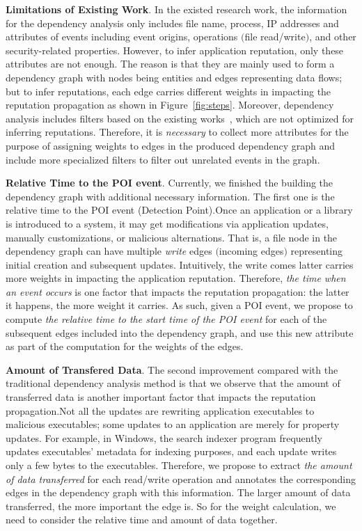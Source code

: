 \textbf{Limitations of Existing Work}.
In the existed research work, the information for the dependency analysis only includes file name, process, IP addresses and attributes of events including event origins, operations $($file read/write$)$, and other security-related properties. However, to infer application reputation, only these attributes are not enough.
The reason is that they are mainly used to form a dependency graph with nodes being entities and edges representing data flows;
but to infer reputations, each edge carries different weights in impacting the reputation propagation as shown in Figure~\ref{fig:steps}.
Moreover, dependency analysis includes filters based on the existing works~\cite{backtracking,backtracking2}, which are not optimized for inferring reputations.
Therefore, it is \emph{necessary} to collect more attributes for the purpose of assigning weights to edges in the produced dependency graph and include more specialized filters to filter out unrelated events in the graph. 

\textbf{Relative Time to the POI event}.
Currently, we finished the building the dependency graph with additional necessary information. The first one is the relative time to the POI event (Detection Point).Once an application or a library is introduced to a system, it may get modifications via application updates, manually customizations, or malicious alternations. 
That is, a file node in the dependency graph can have multiple \emph{write} edges $($incoming edges$)$ representing initial creation and subsequent updates.
Intuitively, the write comes latter carries more weights in impacting the application reputation.
Therefore, \emph{the time when an event occurs} is one factor that impacts the reputation propagation: the latter it happens, the more weight it carries.
As such, given a POI event, we propose to compute \emph{the relative time to the start time of the POI event} for each of the subsequent edges included into the dependency graph,
and use this new attribute as part of the computation for the weights of the edges. 

\textbf{Amount of Transfered Data}.
The second  improvement compared with the traditional dependency analysis method is that we observe that the amount of transferred data is another important factor that impacts the reputation propagation.Not all the updates are rewriting application executables to malicious executables; some updates to an application are merely for property updates.
For example, in Windows, the search indexer program frequently updates executables' metadata for indexing purposes, and each update writes only a few bytes to the executables.
Therefore, we propose to extract \emph{the amount of data transferred} for each read/write operation and annotates the corresponding edges in the dependency graph with this information.
The larger amount of data transferred, the more important the edge is. So for the weight calculation, we need to consider the relative time and amount of data together. 

